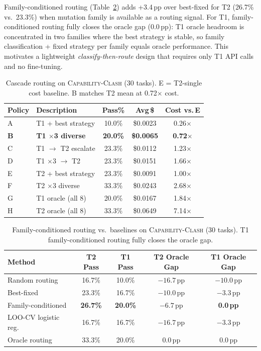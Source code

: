 \documentclass[sigconf,review,anonymous]{acmart}
\newcommand{\ccbench}{\textsc{Capability-Clash}}
\newcommand{\pp}{\,pp}
\begin{document}
Family-conditioned routing (Table~\ref{tab:routing_classifier}) adds +3.4\pp{} over best-fixed for T2 (26.7\% vs.\ 23.3\%) when mutation family is available as a routing signal. For T1, family-conditioned routing fully closes the oracle gap (0.0\pp{}): T1 oracle headroom is concentrated in two families where the best strategy is stable, so family classification + fixed strategy per family equals oracle performance. This motivates a lightweight \emph{classify-then-route} design that requires only T1 API calls and no fine-tuning.

\begin{table}[t]
\centering
\caption{Cascade routing on \ccbench{} (30 tasks). E = T2-single cost baseline. B matches T2 mean at 0.72$\times$ cost.}
\label{tab:cascade}
\small
\begin{tabular}{llccc}
\toprule
Policy & Description & Pass\% & Avg\,\$ & Cost vs.\,E \\
\midrule
A & T1 + best strategy           & 10.0\% & \$0.0023 & 0.26$\times$ \\
\textbf{B} & \textbf{T1 $\times$3 diverse} & \textbf{20.0\%} & \textbf{\$0.0065} & \textbf{0.72$\times$} \\
C & T1 $\to$ T2 escalate         & 23.3\% & \$0.0112 & 1.23$\times$ \\
D & T1 $\times$3 $\to$ T2        & 23.3\% & \$0.0151 & 1.66$\times$ \\
E & T2 + best strategy           & 23.3\% & \$0.0091 & 1.00$\times$ \\
F & T2 $\times$3 diverse         & 33.3\% & \$0.0243 & 2.68$\times$ \\
G & T1 oracle (all 8)            & 20.0\% & \$0.0167 & 1.84$\times$ \\
H & T2 oracle (all 8)            & 33.3\% & \$0.0649 & 7.14$\times$ \\
\bottomrule
\end{tabular}
\end{table}

\begin{table}[t]
\centering
\caption{Family-conditioned routing vs.\ baselines on \ccbench{} (30 tasks). T1 family-conditioned routing fully closes the oracle gap.}
\label{tab:routing_classifier}
\small
\begin{tabular}{lcccc}
\toprule
Method & T2 Pass & T1 Pass & T2 Oracle Gap & T1 Oracle Gap \\
\midrule
Random routing          & 16.7\% & 10.0\% & $-16.7$\pp{} & $-10.0$\pp{} \\
Best-fixed              & 23.3\% & 16.7\% & $-10.0$\pp{} & $-3.3$\pp{} \\
Family-conditioned      & \textbf{26.7\%} & \textbf{20.0\%} & $-6.7$\pp{} & \textbf{0.0\pp{}} \\
LOO-CV logistic reg.    & 16.7\% & 16.7\% & $-16.7$\pp{} & $-3.3$\pp{} \\
Oracle routing          & 33.3\% & 20.0\% & 0.0\pp{} & 0.0\pp{} \\
\bottomrule
\end{tabular}
\end{table}
\end{document}

